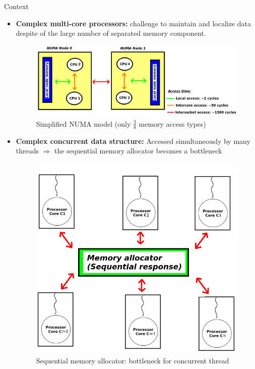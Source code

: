 \documentclass[final]{beamer}
\newlength{\onecolwid}
\begin{document}
\begin{frame}[t]
\begin{columns}[t]
\begin{column}{\onecolwid}
\begin{block}{Context}
\begin{itemize}
\item \textbf{Complex multi-core processors:} challenge to maintain and localize data despite of the large number of separated memory component.\\
    \begin{figure}
    \includegraphics[width=1.0\linewidth]{charts/numaNode.png}
    \caption{Simplified NUMA model (only $\frac{3}{8}$ memory access types)}
    \end{figure}

\item \textbf{Complex concurrent data structure:} Accessed simultaneously by many threads $\Rightarrow$ the sequential memory allocator becomes a bottleneck\\
    \begin{figure}
    \includegraphics[width=0.9\linewidth]{charts/bottleneck.png}
    \caption{Sequential memory allocator: bottleneck for concurrent thread}
    \end{figure}


\end{itemize}
\end{block}
\end{column}
\end{columns}
\end{frame}
\end{document}
